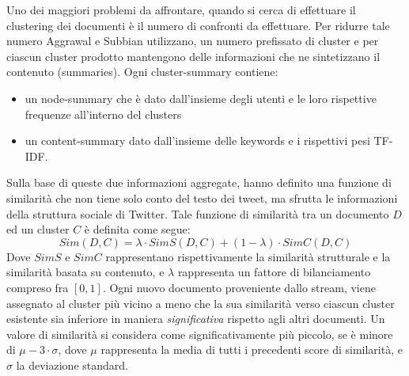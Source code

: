Uno dei maggiori problemi da affrontare, quando si cerca di effettuare il clustering dei documenti è il numero di confronti da effettuare. Per ridurre tale numero Aggrawal e Subbian \cite{doi:10.1137/1.9781611972825.54} utilizzano, un numero prefissato di cluster e per ciascun cluster prodotto mantengono delle informazioni che ne sintetizzano il contenuto (summaries). Ogni cluster-summary contiene: 
\begin{itemize}
\item un node-summary che è dato dall'insieme degli utenti e le  loro rispettive frequenze all'interno del clusters
\item un content-summary dato dall'insieme delle keywords e i rispettivi pesi TF-IDF.
\end{itemize} 
Sulla base di queste due informazioni aggregate, hanno definito una funzione di similarità che  non tiene solo conto del testo dei tweet, ma  sfrutta le informazioni della struttura sociale di Twitter.
Tale funzione di similarità tra un documento $D$ ed un cluster $C$ è definita come segue:
\begin{equation}
\label{eq:aggrawalSim}
Sim(D,C)=\lambda\cdot SimS(D,C)+(1-\lambda)\cdot SimC(D,C)
\end{equation}
\color{red}
Dove $SimS$ e $SimC$ rappresentano rispettivamente la similarità strutturale e la similarità basata su contenuto, e $\lambda$ rappresenta un fattore di bilanciamento compreso fra $[0,1]$.
Ogni nuovo documento proveniente dallo stream, viene assegnato al cluster più vicino a meno che la sua similarità verso ciascun cluster esistente sia inferiore in maniera \emph	{significativa} rispetto agli altri documenti.  Un valore di similarità si considera come significativamente più piccolo, se è minore di $\mu-3 \cdot \sigma$, dove $\mu$ rappresenta la media di tutti i precedenti score di similarità, e $\sigma$ la deviazione standard.
\color{black}

